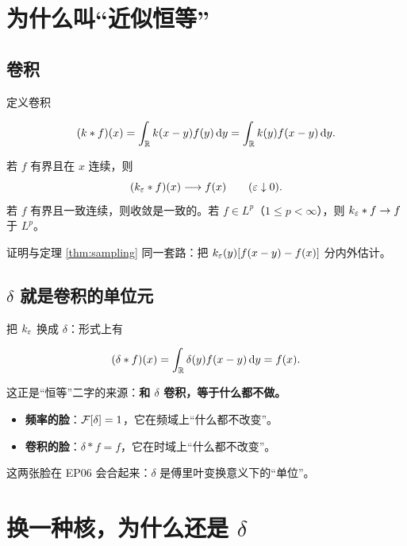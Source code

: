 \section{为什么叫“近似恒等”}

\subsection{卷积}

定义卷积

\begin{equation}
(k*f)(x)=\int_{\mathbb{R}}k(x-y)f(y)\mathop{}\!\mathrm{d} y=\int_{\mathbb{R}}k(y)f(x-y)\mathop{}\!\mathrm{d} y .
\end{equation}

\begin{thm}[近似恒等]\label{thm:approx-id}
若 $f$ 有界且在 $x$ 连续，则
\begin{equation}
(k_\varepsilon*f)(x)\longrightarrow f(x)\qquad(\varepsilon\downarrow0).
\end{equation}
若 $f$ 有界且一致连续，则收敛是一致的。若 $f\in L^{p}$（$1\le p<\infty$），则 $k_\varepsilon*f\to f$ 于 $L^{p}$。
\end{thm}

证明与定理 \ref{thm:sampling} 同一套路：把 $k_\varepsilon(y)[f(x-y)-f(x)]$ 分内外估计。

\subsection{$\delta$ 就是卷积的单位元}

把 $k_\varepsilon$ 换成 $\delta$：形式上有

\begin{equation}
(\delta*f)(x)=\int_{\mathbb{R}}\delta(y)f(x-y)\mathop{}\!\mathrm{d} y=f(x).
\end{equation}

这正是“恒等”二字的来源：\textbf{和 $\delta$ 卷积，等于什么都不做。}

\begin{ideabox}
\begin{itemize}[leftmargin=1.4em,itemsep=0.2em]
\item \textbf{频率的脸}：$\mathcal{F}[\delta]=1$，它在频域上“什么都不改变”。
\item \textbf{卷积的脸}：$\delta*f=f$，它在时域上“什么都不改变”。
\end{itemize}
这两张脸在 EP06 会合起来：$\delta$ 是傅里叶变换意义下的“单位”。
\end{ideabox}

\section{换一种核，为什么还是 $\delta$}

